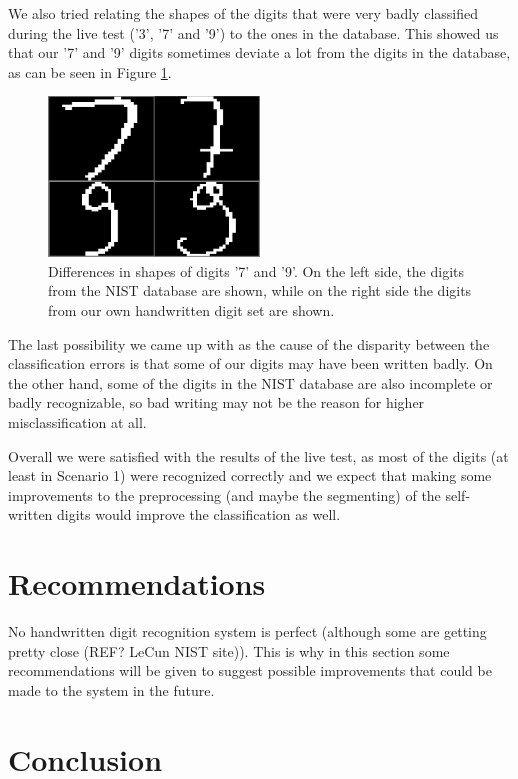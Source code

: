 \documentclass[11pt,twoside,a4paper]{article}
\begin{document}
We also tried relating the shapes of the digits that were very badly classified during the live test ('3', '7' and '9') to the ones in the database. This showed us that our '7' and '9' digits sometimes deviate a lot from the digits in the database, as can be seen in Figure \ref{img:nistvslive}.\newline
\begin{figure}[h]
  \centering
  \captionsetup{justification=centering}
  \includegraphics[width=0.5\textwidth]{NISTvsLIVE_7.png}
  \caption{Differences in shapes of digits '7' and '9'. On the left side, the digits from the NIST database are shown, while on the right side the digits from our own handwritten digit set are shown.}
  \label{img:nistvslive}
\end{figure}

The last possibility we came up with as the cause of the disparity between the classification errors is that some of our digits may have been written badly. On the other hand, some of the digits in the NIST database are also incomplete or badly recognizable, so bad writing may not be the reason for higher misclassification at all.

Overall we were satisfied with the results of the live test, as most of the digits (at least in Scenario 1) were recognized correctly and we expect that making some improvements to the preprocessing (and maybe the segmenting) of the self-written digits would improve the classification as well.

\section{Recommendations}
No handwritten digit recognition system is perfect (although some are getting pretty close (REF? LeCun NIST site)). This is why in this section some recommendations will be given to suggest possible improvements that could be made to the system in the future.

\section{Conclusion}
\end{document}
